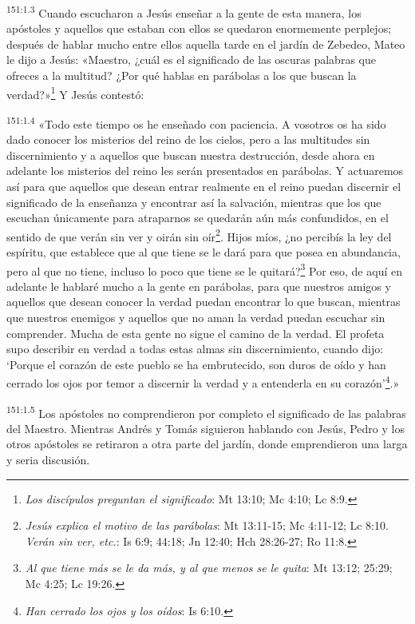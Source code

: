 \par 
\textsuperscript{151:1.3} Cuando escucharon a Jesús enseñar a la gente de esta manera, los apóstoles y aquellos que estaban con ellos se quedaron enormemente perplejos; después de hablar mucho entre ellos aquella tarde en el jardín de Zebedeo, Mateo le dijo a Jesús: «Maestro, ¿cuál es el significado de las oscuras palabras que ofreces a la multitud? ¿Por qué hablas en parábolas a los que buscan la verdad?»\footnote{\textit{Los discípulos preguntan el significado}: Mt 13:10; Mc 4:10; Lc 8:9.} Y Jesús contestó:

\par 
\textsuperscript{151:1.4} «Todo este tiempo os he enseñado con paciencia. A vosotros os ha sido dado conocer los misterios del reino de los cielos, pero a las multitudes sin discernimiento y a aquellos que buscan nuestra destrucción, desde ahora en adelante los misterios del reino les serán presentados en parábolas. Y actuaremos así para que aquellos que desean entrar realmente en el reino puedan discernir el significado de la enseñanza y encontrar así la salvación, mientras que los que escuchan únicamente para atraparnos se quedarán aún más confundidos, en el sentido de que verán sin ver y oirán sin oír\footnote{\textit{Jesús explica el motivo de las parábolas}: Mt 13:11-15; Mc 4:11-12; Lc 8:10. \textit{Verán sin ver, etc.}: Is 6:9; 44:18; Jn 12:40; Hch 28:26-27; Ro 11:8.}. Hijos míos, ¿no percibís la ley del espíritu, que establece que al que tiene se le dará para que posea en abundancia, pero al que no tiene, incluso lo poco que tiene se le quitará?\footnote{\textit{Al que tiene más se le da más, y al que menos se le quita}: Mt 13:12; 25:29; Mc 4:25; Lc 19:26.} Por eso, de aquí en adelante le hablaré mucho a la gente en parábolas, para que nuestros amigos y aquellos que desean conocer la verdad puedan encontrar lo que buscan, mientras que nuestros enemigos y aquellos que no aman la verdad puedan escuchar sin comprender. Mucha de esta gente no sigue el camino de la verdad. El profeta supo describir en verdad a todas estas almas sin discernimiento, cuando dijo: `Porque el corazón de este pueblo se ha embrutecido, son duros de oído y han cerrado los ojos por temor a discernir la verdad y a entenderla en su corazón'\footnote{\textit{Han cerrado los ojos y los oídos}: Is 6:10.}.»

\par 
\textsuperscript{151:1.5} Los apóstoles no comprendieron por completo el significado de las palabras del Maestro. Mientras Andrés y Tomás siguieron hablando con Jesús, Pedro y los otros apóstoles se retiraron a otra parte del jardín, donde emprendieron una larga y seria discusión.

